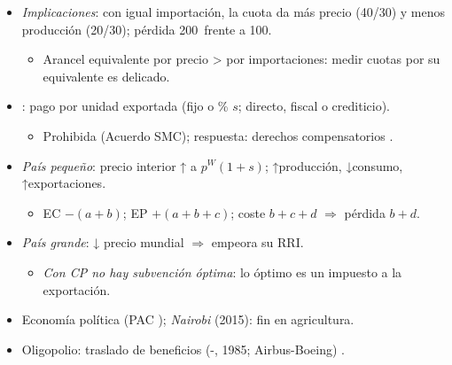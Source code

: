 \documentclass{article}
\begin{document}
\begin{columnas}
\begin{itemize}
  \begin{itemize}
  \item \emph{autarquía}: $100-2q=q$ $\Rightarrow$ $q=33{,}3$, $p=66{,}7$;
  \item \emph{libre comercio}: demanda horizontal a $p^W$ $\Rightarrow$ $q=20$, $M=60$ (el comercio disciplina);
  \item \emph{arancel} 50\,\%: horizontal a 30 $\Rightarrow$ $q=30$, $M=40$, como CP;
  \item \emph{cuota} de 40: monopolista de la  $60-p$: $60-2q=q$ $\Rightarrow$ $q=20$, $p=40$.
  \end{itemize}
\item \emph{Implicaciones}: con igual importación, la cuota da más precio (40/30) y menos producción (20/30); pérdida 200~frente a 100.
  \begin{itemize}
  \item Arancel equivalente por precio > por importaciones: medir cuotas por su equivalente es delicado.
  \end{itemize}
\end{itemize}

\begin{itemize}
\item {}: pago por unidad exportada (fijo o \% $s$; directo, fiscal o crediticio).
  \begin{itemize}
  \item Prohibida (Acuerdo SMC); respuesta: derechos compensatorios .
  \end{itemize}
\item \emph{País pequeño}: precio interior ↑ a $p^W(1+s)$; ↑producción, ↓consumo, ↑exportaciones.
  \begin{itemize}
  \item EC $-(a+b)$; EP $+(a+b+c)$; coste $b+c+d$ $\Rightarrow$ pérdida $b+d$.
  \end{itemize}
\item \emph{País grande}: ↓ precio mundial $\Rightarrow$ empeora su RRI.
  \begin{itemize}
  \item \emph{Con CP no hay subvención óptima}: lo óptimo es un impuesto a la exportación.
  \end{itemize}
\item Economía política (PAC ); \emph{Nairobi} (2015): fin en agricultura.
\item Oligopolio: traslado de beneficios (-, 1985; Airbus-Boeing) .
\end{itemize}


\end{columnas}
\end{document}
